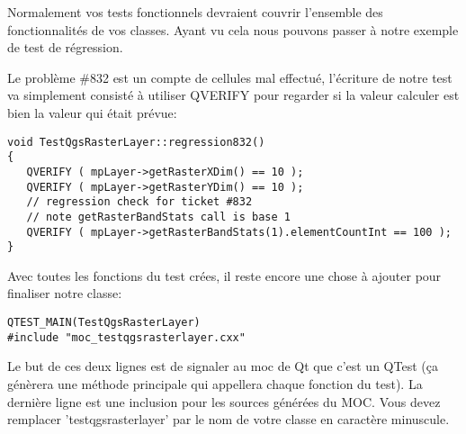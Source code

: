 % 
Normalement vos tests fonctionnels devraient couvrir l'ensemble des fonctionnalités de vos classes. Ayant vu cela nous pouvons passer à notre exemple de test de régression.

Le problème \#832 est un compte de cellules mal effectué, l'écriture de notre test va simplement consisté à utiliser QVERIFY pour regarder si la valeur calculer est bien la valeur qui était prévue:

\begin{verbatim}
void TestQgsRasterLayer::regression832()
{
   QVERIFY ( mpLayer->getRasterXDim() == 10 );
   QVERIFY ( mpLayer->getRasterYDim() == 10 );
   // regression check for ticket #832
   // note getRasterBandStats call is base 1
   QVERIFY ( mpLayer->getRasterBandStats(1).elementCountInt == 100 );
}
\end{verbatim}

Avec toutes les fonctions du test crées, il reste encore une chose à ajouter pour finaliser notre classe:

\begin{verbatim}
QTEST_MAIN(TestQgsRasterLayer)
#include "moc_testqgsrasterlayer.cxx"
\end{verbatim}

Le but de ces deux lignes est de signaler au moc de Qt que c'est un QTest (ça génèrera une méthode principale qui appellera chaque fonction du test). La dernière ligne est une inclusion pour les sources générées du MOC. Vous devez remplacer 'testqgsrasterlayer' par le nom de votre classe en caractère minuscule.

